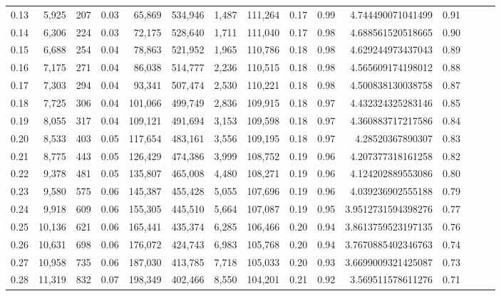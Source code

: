 \begin{tabular}{rrrrrrrrrrrrrrr}
0.13 &   5,925 &    207 &  0.03 &   65,869 &  534,946 &    1,487 &  111,264 &  0.17 &  0.99 &     4.744490071041499 &      0.91 \\
0.14 &   6,306 &    224 &  0.03 &   72,175 &  528,640 &    1,711 &  111,040 &  0.17 &  0.98 &     4.688561520518665 &      0.90 \\
0.15 &   6,688 &    254 &  0.04 &   78,863 &  521,952 &    1,965 &  110,786 &  0.18 &  0.98 &     4.629244973437043 &      0.89 \\
0.16 &   7,175 &    271 &  0.04 &   86,038 &  514,777 &    2,236 &  110,515 &  0.18 &  0.98 &     4.565609174198012 &      0.88 \\
0.17 &   7,303 &    294 &  0.04 &   93,341 &  507,474 &    2,530 &  110,221 &  0.18 &  0.98 &     4.500838130038758 &      0.87 \\
0.18 &   7,725 &    306 &  0.04 &  101,066 &  499,749 &    2,836 &  109,915 &  0.18 &  0.97 &     4.432324325283146 &      0.85 \\
0.19 &   8,055 &    317 &  0.04 &  109,121 &  491,694 &    3,153 &  109,598 &  0.18 &  0.97 &     4.360883717217586 &      0.84 \\
0.20 &   8,533 &    403 &  0.05 &  117,654 &  483,161 &    3,556 &  109,195 &  0.18 &  0.97 &      4.28520367890307 &      0.83 \\
0.21 &   8,775 &    443 &  0.05 &  126,429 &  474,386 &    3,999 &  108,752 &  0.19 &  0.96 &     4.207377318161258 &      0.82 \\
0.22 &   9,378 &    481 &  0.05 &  135,807 &  465,008 &    4,480 &  108,271 &  0.19 &  0.96 &     4.124202889553086 &      0.80 \\
0.23 &   9,580 &    575 &  0.06 &  145,387 &  455,428 &    5,055 &  107,696 &  0.19 &  0.96 &     4.039236902555188 &      0.79 \\
0.24 &   9,918 &    609 &  0.06 &  155,305 &  445,510 &    5,664 &  107,087 &  0.19 &  0.95 &    3.9512731594398276 &      0.77 \\
0.25 &  10,136 &    621 &  0.06 &  165,441 &  435,374 &    6,285 &  106,466 &  0.20 &  0.94 &    3.8613759523197135 &      0.76 \\
0.26 &  10,631 &    698 &  0.06 &  176,072 &  424,743 &    6,983 &  105,768 &  0.20 &  0.94 &    3.7670885402346763 &      0.74 \\
0.27 &  10,958 &    735 &  0.06 &  187,030 &  413,785 &    7,718 &  105,033 &  0.20 &  0.93 &    3.6699009321425087 &      0.73 \\
0.28 &  11,319 &    832 &  0.07 &  198,349 &  402,466 &    8,550 &  104,201 &  0.21 &  0.92 &     3.569511578611276 &      0.71 \\

\end{tabular}
